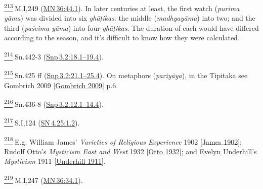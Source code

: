 \label{footprints_split_024.html_fn213}
\hyperref[footprints_split_009.htmlux5cux23fnref213]{\textsuperscript{213}} M.I,249
(\href{https://suttacentral.net/mn36/en/sujato\#44.1}{MN\,36:44.1}). In
later centuries at least, the first watch (\emph{purima yāma}) was
divided into six \emph{ghāṭikas}: the middle (\emph{madhyayāma}) into
two; and the third (\emph{paścima yāma}) into four \emph{ghāṭikas}. The
duration of each would have differed according to the season, and it's
difficult to know how they were calculated.

\label{footprints_split_024.html_fn214}
\hyperref[footprints_split_009.htmlux5cux23fnref214]{\textsuperscript{214}} Sn.442-3
(\href{https://suttacentral.net/snp3.2/en/sujato\#18.1}{Snp\,3.2:18.1--19.4}).

\label{footprints_split_024.html_fn215}
\hyperref[footprints_split_009.htmlux5cux23fnref215]{\textsuperscript{215}} Sn.425
ff
(\href{https://suttacentral.net/snp3.2/en/sujato\#21.1}{Snp\,3.2:21.1--25.4}).
On metaphors (\emph{pariyāya}), in the Tipitaka see {Gombrich 2009
{{[}\hyperref[footprints_split_022.htmlux5cux23Gombrichux5cux25202009]{Gombrich
2009}{]}}} p.6.

\label{footprints_split_024.html_fn216}
\hyperref[footprints_split_009.htmlux5cux23fnref216]{\textsuperscript{216}} Sn.436-8
(\href{https://suttacentral.net/snp3.2/en/sujato\#12.1}{Snp\,3.2:12.1--14.4}).

\label{footprints_split_024.html_fn217}
\hyperref[footprints_split_009.htmlux5cux23fnref217]{\textsuperscript{217}} S.I,124
(\href{https://suttacentral.net/sn4.25/en/sujato\#1.2}{SN\,4.25:1.2}).

\label{footprints_split_024.html_fn218}
\hyperref[footprints_split_009.htmlux5cux23fnref218]{\textsuperscript{218}} E.g.
William James' {\emph{Varieties of Religious Experience} 1902
{{[}\hyperref[footprints_split_023.htmlux5cux23Jamesux5cux25201902]{James
1902}{]}}}; Rudolf Otto's {\emph{Mysticism East and West} 1932
{{[}\hyperref[footprints_split_023.htmlux5cux23Ottoux5cux25201932]{Otto
1932}{]}}}; and Evelyn Underhill's {\emph{Mysticism} 1911
{{[}\hyperref[footprints_split_023.htmlux5cux23Underhillux5cux25201911]{Underhill
1911}{]}}}.

\label{footprints_split_024.html_fn219}
\hyperref[footprints_split_009.htmlux5cux23fnref219]{\textsuperscript{219}} M.I,247
(\href{https://suttacentral.net/mn36/en/sujato\#34.1}{MN\,36:34.1}).

